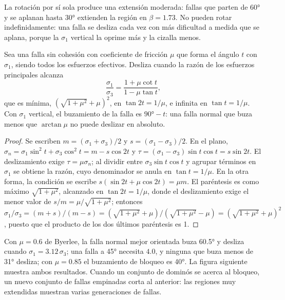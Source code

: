 La rotación por sí sola produce una extensión moderada: fallas que parten de \ang{60} y
se aplanan hasta \ang{30} extienden la región en $\beta = 1.73$. No pueden rotar
indefinidamente: una falla se desliza cada vez con más dificultad a medida que se aplana, porque la
$\sigma_1$ vertical la oprime más y la cizalla menos.

\begin{proposition}\label{prop:b3:extension-strike-slip:lockup}
Sea una falla sin cohesión con coeficiente de fricción $\mu$ que forma el ángulo
$t$ con $\sigma_1$, siendo todos los esfuerzos efectivos. Desliza cuando la razón de los
esfuerzos principales alcanza
\[
  \frac{\sigma_1}{\sigma_3} = \frac{1 + \mu\cot t}{1 - \mu\tan t} ,
\]
que es mínima, $(\sqrt{1 + \mu^2} + \mu)^2$, en $\tan2t = 1/\mu$, e
infinita en $\tan t = 1/\mu$. Con $\sigma_1$ vertical, el buzamiento de la falla es
$\ang{90} - t$: una falla normal que buza menos que $\arctan\mu$ no puede deslizar
en absoluto.
\end{proposition}

\begin{proof}
Se escriben $m = (\sigma_1 + \sigma_3)/2$ y $s = (\sigma_1 - \sigma_3)/2$. En
el plano, $\sigma_n = \sigma_1\sin^2t + \sigma_3\cos^2t = m - s\cos2t$ y
$\tau = (\sigma_1 - \sigma_3)\sin t\cos t = s\sin2t$. El deslizamiento exige $\tau =
\mu\sigma_n$; al dividir entre $\sigma_3\sin t\cos t$ y agrupar términos en $\sigma_1$
se obtiene la razón, cuyo denominador se anula en $\tan t = 1/\mu$. En la otra
forma, la condición se escribe $s(\sin2t + \mu\cos2t) = \mu m$. El paréntesis es como
máximo $\sqrt{1 + \mu^2}$, alcanzado en $\tan2t = 1/\mu$, donde el deslizamiento exige el
menor valor de $s/m = \mu/\sqrt{1 + \mu^2}$; entonces $\sigma_1/\sigma_3 = (m + s)/(m - s) =
(\sqrt{1 + \mu^2} + \mu)/(\sqrt{1 + \mu^2} - \mu) = (\sqrt{1 + \mu^2} +
\mu)^2$, puesto que el producto de los dos últimos paréntesis es 1.
\end{proof}

Con $\mu = 0.6$ de Byerlee, la falla normal mejor orientada buza \ang{60.5} y
desliza cuando $\sigma_1 = 3.12\,\sigma_3$; una falla a \ang{45} necesita $4.0$, y
ninguna que buza menos de \ang{31} desliza; con $\mu = 0.85$ el buzamiento de bloqueo es
\ang{40}. La figura siguiente muestra ambos resultados. Cuando un conjunto de dominós se acerca al
bloqueo, un nuevo conjunto de fallas empinadas corta al anterior: las regiones muy extendidas
muestran varias generaciones de fallas.

